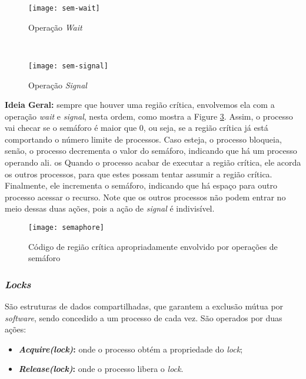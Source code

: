 \begin{figure*}[ht]

  \begin{subfigure}[t]{.5\textwidth}
    \centering
    \texttt{[image: sem-wait]}
    \caption{Operação \textit{Wait}}
    \label{subfig:sem-wait}
  \end{subfigure}
  ~
  \begin{subfigure}[t]{.5\textwidth}
    \centering
    \texttt{[image: sem-signal]}
    \caption{Operação \textit{Signal}}
    \label{subfig:sem-signal}
  \end{subfigure}

  \caption{Operações de semáforos}
  \label{fig:sem-ops}
\end{figure*}

\textbf{Ideia Geral:} sempre que houver uma região crítica, envolvemos ela com a operação \textit{wait} e \textit{signal}, nesta ordem, como mostra a Figure \ref{fig:semaphore}. Assim, o processo vai checar se o semáforo é maior que 0, ou seja, se a região crítica já está comportando o número limite de processos. Caso esteja, o processo bloqueia, senão, o processo decrementa o valor do semáforo, indicando que há um processo operando ali.
os
Quando o processo acabar de executar a região crítica, ele acorda os outros processos, para que estes possam tentar assumir a região crítica. Finalmente, ele incrementa o semáforo, indicando que há espaço para outro processo acessar o recurso. Note que os outros processos não podem entrar no meio dessas duas ações, pois a ação de \textit{signal} é indivisível.


\begin{figure}[ht]
  \centering
  \texttt{[image: semaphore]}
  \caption{Código de região crítica apropriadamente envolvido por operações de semáforo}
  \label{fig:semaphore}
\end{figure}






\subsubsection{\textit{Locks}}
São estruturas de dados compartilhadas, que garantem a exclusão mútua por \textit{software}, sendo concedido a um processo de cada vez. São operados por duas ações:

\begin{itemize}
  \item \textbf{\textit{Acquire(lock)}:} onde o processo obtém a propriedade do \textit{lock};

  \item \textbf{\textit{Release(lock)}:} onde o processo libera o \textit{lock}.
\end{itemize}

